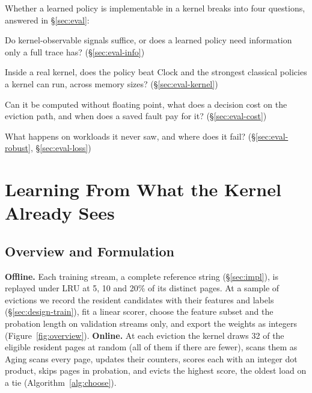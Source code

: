 \documentclass{article}
\newcommand{\clock}{Clock\xspace}
\newcommand{\finding}[1]{\textbf{#1}\hspace{0.4em}}
\begin{document}
Whether a learned policy is implementable in a kernel breaks into four questions,
answered in \S\ref{sec:eval}:
\begin{description}[topsep=2pt, itemsep=1pt, parsep=0pt]
\item[RQ1 Information.] Do kernel-observable signals suffice, or does a learned policy
  need information only a full trace has? (\S\ref{sec:eval-info})
\item[RQ2 Effect in the kernel.] Inside a real kernel, does the policy beat \clock and
  the strongest classical policies a kernel can run, across memory sizes?
  (\S\ref{sec:eval-kernel})
\item[RQ3 Cost.] Can it be computed without floating point, what does a decision cost
  on the eviction path, and when does a saved fault pay for it? (\S\ref{sec:eval-cost})
\item[RQ4 Robustness.] What happens on workloads it never saw, and where does it fail?
  (\S\ref{sec:eval-robust}, \S\ref{sec:eval-loss})
\end{description}
\section{Learning From What the Kernel Already Sees}
\label{sec:design}

\subsection{Overview and Formulation}
\label{sec:design-overview}

\finding{Offline.} Each training stream, a complete reference string
(\S\ref{sec:impl}), is replayed under LRU at 5, 10 and 20\% of its distinct pages. At a
sample of evictions we record the resident candidates with their features and labels
(\S\ref{sec:design-train}), fit a linear scorer, choose the feature subset and the
probation length on validation streams only, and export the weights as integers
(Figure~\ref{fig:overview}).
\finding{Online.} At each eviction the kernel draws 32 of the eligible resident pages at
random (all of them if there are fewer), scans them as Aging scans every page, updates
their counters, scores each with an integer dot product, skips pages in probation, and
evicts the highest score, the oldest load on a tie (Algorithm~\ref{alg:choose}).
\end{document}
